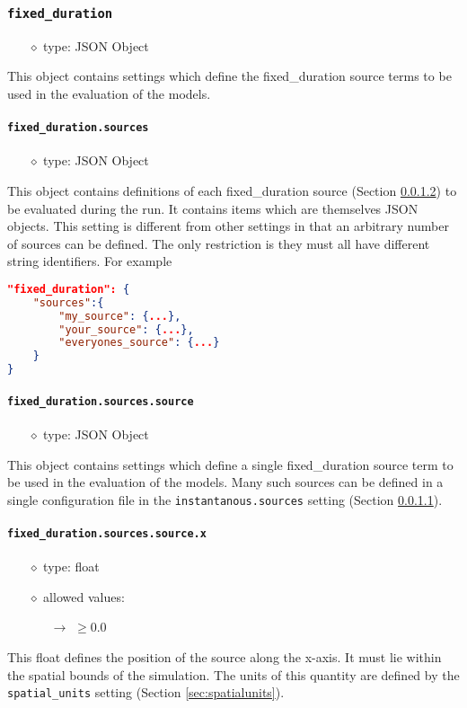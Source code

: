 \documentclass[]{article}
\def\code#1{\texttt{#1}}
\begin{document}
\subsubsection{\code{fixed\_duration}}
\begin{itemize}
    \item[$\diamond$] type: JSON Object 
\end{itemize}
This object contains settings which define the fixed\_duration source terms to be
used in the evaluation of the models.

\paragraph{\code{fixed\_duration.sources}}\label{sec:fixsources}
\begin{itemize}
    \item[$\diamond$] type: JSON Object 
\end{itemize}
This object contains definitions of each fixed\_duration source (Section
\ref{sec:fixsource}) to be evaluated during the run. It contains items which
are themselves JSON objects. This setting is different from other settings in
that an arbitrary number of sources can be defined. The only restriction is they
must all have different string identifiers. For example\\
\begin{lstlisting}[language=json,firstnumber=1]
"fixed_duration": {
    "sources":{
        "my_source": {...},
        "your_source": {...},
        "everyones_source": {...}
    }
}
\end{lstlisting}

\paragraph{\code{fixed\_duration.sources.source}}\label{sec:fixsource}
\begin{itemize}
    \item[$\diamond$] type: JSON Object 
\end{itemize}
This object contains settings which define a single fixed\_duration source term to
be used in the evaluation of the models. Many such sources can be defined in a
single configuration file in the \code{instantanous.sources} setting (Section
\ref{sec:fixsources}).

\paragraph{\code{fixed\_duration.sources.source.x}}\label{sec:fixsourcex}
\begin{itemize}
    \item[$\diamond$] type: float 
    \item[$\diamond$] allowed values:
    \begin{itemize}
        \item[$\rightarrow$] $\geq0.0$
    \end{itemize}
\end{itemize}
This float defines the position of the source along the x-axis. It must lie
within the spatial bounds of the simulation. The units of this quantity are
defined by the \code{spatial\_units} setting (Section \ref{sec:spatialunits}).
\end{document}
